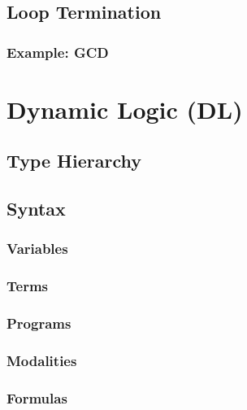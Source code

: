 \documentclass[a4paper, 11pt, accentcolor = tud3b]{tudreport}
\begin{document}
		\section{Loop Termination} %

			\subsection{Example: GCD} %

	\chapter{Dynamic Logic (DL)} %

		\section{Type Hierarchy} %

		\section{Syntax} %

			\subsection{Variables} %

			\subsection{Terms} %

			\subsection{Programs} %

			\subsection{Modalities} %

			\subsection{Formulas} %
\end{document}
